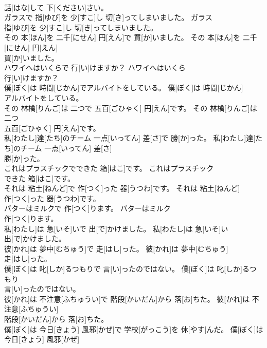 \documentclass[8pt]{extreport}
\begin{document}
\begin{CJK}{UTF8}{min}
\\	話[はな]して 下[ください]さい。	
\\	ガラスで 指[ゆび]を 少[すこ]し 切[き]ってしまいました。	ガラス
\\	指[ゆび]を 少[すこ]し 切[き]ってしまいました。	
\\	その 本[ほん]を 二千[にせん] 円[えん]で 買[か]いました。	その 本[ほん]を 二千[にせん] 円[えん]
\\	買[か]いました。	
\\	ハワイへはいくらで 行[い]けますか？	ハワイへはいくら
\\	行[い]けますか？	
\\	僕[ぼく]は 時間[じかん]でアルバイトをしている。	僕[ぼく]は 時間[じかん]
\\	アルバイトをしている。	
\\	その 林檎[りんご]は 二つで 五百[ごひゃく] 円[えん]です。	その 林檎[りんご]は 二つ
\\	五百[ごひゃく] 円[えん]です。	
\\	私[わたし]達[たち]のチーム 一点[いってん] 差[さ]で 勝[か]った。	私[わたし]達[たち]のチーム 一点[いってん] 差[さ]
\\	勝[か]った。	
\\	これはプラスチックでできた 箱[はこ]です。	これはプラスチック
\\	できた 箱[はこ]です。	
\\	それは 粘土[ねんど]で 作[つく]った 器[うつわ]です。	それは 粘土[ねんど]
\\	作[つく]った 器[うつわ]です。	
\\	バターはミルクで 作[つく]ります。	バターはミルク
\\	作[つく]ります。	
\\	私[わたし]は 急[いそ]いで 出[で]かけました。	私[わたし]は 急[いそ]い
\\	出[で]かけました。	
\\	彼[かれ]は 夢中[むちゅう]で 走[はし]った。	彼[かれ]は 夢中[むちゅう]
\\	走[はし]った。	
\\	僕[ぼく]は 叱[しか]るつもりで 言[い]ったのではない。	僕[ぼく]は 叱[しか]るつもり
\\	言[い]ったのではない。	
\\	彼[かれ]は 不注意[ふちゅうい]で 階段[かいだん]から 落[お]ちた。	彼[かれ]は 不注意[ふちゅうい]
\\	階段[かいだん]から 落[お]ちた。	
\\	僕[ぼく]は 今日[きょう] 風邪[かぜ]で 学校[がっこう]を 休[やす]んだ。	僕[ぼく]は 今日[きょう] 風邪[かぜ]

\end{CJK}
\end{document}
